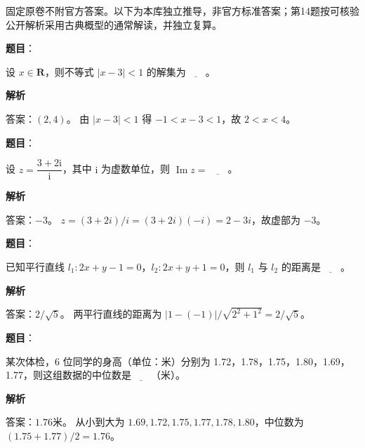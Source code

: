 

\begin{gktip}
固定原卷不附官方答案。以下为本库独立推导，非官方标准答案；第14题按可核验公开解析采用古典概型的通常解读，并独立复算。
\end{gktip}

\begin{answer}

\textbf{题目}：

设 \(x\in\mathbf{R}\)，则不等式 \(|x-3|<1\) 的解集为\(\underline{\qquad}\)。

\textbf{解析}

答案：\((2,4)\)。
由 \(|x-3|<1\) 得 \(-1<x-3<1\)，故 \(2<x<4\)。


\end{answer}
\begin{answer}

\textbf{题目}：

设 \(z=\dfrac{3+2\mathrm{i}}{\mathrm{i}}\)，其中 \(\mathrm{i}\) 为虚数单位，则 \(\operatorname{Im}z=\)\(\underline{\qquad}\)。

\textbf{解析}

答案：\(-3\)。
\(z=(3+2i)/i=(3+2i)(-i)=2-3i\)，故虚部为 \(-3\)。


\end{answer}
\begin{answer}

\textbf{题目}：

已知平行直线 \(l_1:2x+y-1=0\)，\(l_2:2x+y+1=0\)，则 \(l_1\) 与 \(l_2\) 的距离是\(\underline{\qquad}\)。

\textbf{解析}

答案：\(2/\sqrt5\)。
两平行直线的距离为 \(|1-(-1)|/\sqrt{2^2+1^2}=2/\sqrt5\)。


\end{answer}
\begin{answer}

\textbf{题目}：

某次体检，6 位同学的身高（单位：米）分别为 1.72，1.78，1.75，1.80，1.69，1.77，则这组数据的中位数是\(\underline{\qquad}\)（米）。

\textbf{解析}

答案：\(1.76\)米。
从小到大为 \(1.69,1.72,1.75,1.77,1.78,1.80\)，中位数为 \((1.75+1.77)/2=1.76\)。


\end{answer}
